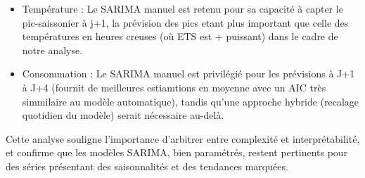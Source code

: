 \documentclass{article}
\theoremstyle{definition}
\theoremstyle{remark}
\begin{document}
\begin{itemize}
    \item Température : Le SARIMA manuel est retenu pour sa capacité à capter le pic-saissonier à j+1, la prévision des pics etant plus important que celle des températures en heures creuses (où ETS est + puissant) dans le cadre de notre analyse.
    \item Consommation : Le SARIMA manuel est privilégié pour les prévisions à J+1 à J+4 (fournit de meilleures estiamtions en moyenne avec un AIC très simmilaire au modèle automatique), tandis qu'une approche hybride (recalage quotidien du modèle) serait nécessaire au-delà.
\end{itemize}


Cette analyse souligne l'importance d'arbitrer entre complexité et interprétabilité, et confirme que les modèles SARIMA, bien paramétrés, restent pertinents pour des séries présentant des saisonnalités et des tendances marquées.
\end{document}
